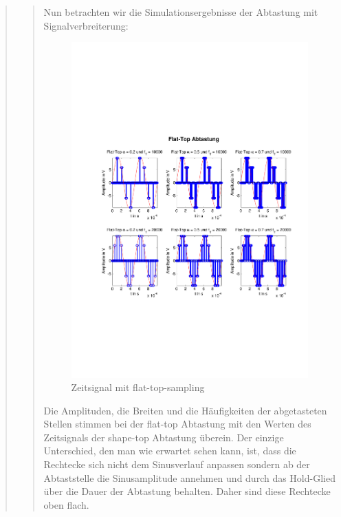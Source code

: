 \begin{quote}
\begin{quote}
  	    Nun betrachten wir die Simulationsergebnisse der Abtastung mit
  	    Signalverbreiterung:
  	    
  	    \begin{figure}[H]
    \centering
        \includegraphics[scale=0.6, trim = 1.5cm 6cm 1cm 8cm,
        clip]{./Bilder/flat-top-zeit_5V}
            \caption{Zeitsignal mit flat-top-sampling}
  	    \end{figure}
  	    
  	    Die Amplituden, die Breiten und die Häufigkeiten der abgetasteten Stellen
  	    stimmen bei der flat-top Abtastung mit den Werten des Zeitsignals der
  	    shape-top Abtastung überein. Der einzige Unterschied, den man wie erwartet sehen
  	    kann, ist, dass die Rechtecke sich nicht dem Sinusverlauf anpassen
  	    sondern ab der Abtaststelle die Sinusamplitude annehmen und durch das
  	    Hold-Glied über die Dauer der Abtastung behalten. Daher sind diese
  	    Rechtecke oben flach.\\
  	    

\end{quote}
\end{quote}

